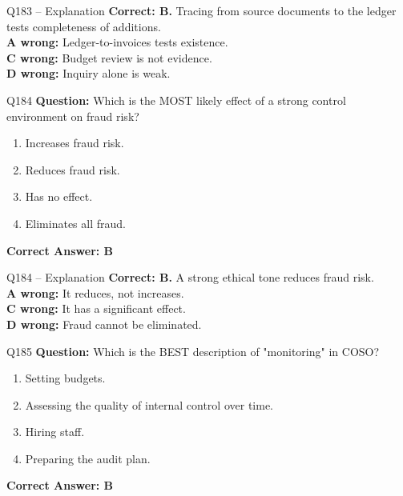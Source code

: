 \documentclass[aspectratio=169,10pt]{beamer}
\begin{document}
	\begin{frame}[t]{Q183 -- Explanation}
		\small
		\textbf{Correct: B.} Tracing from source documents to the ledger tests completeness of additions. \\[4pt]
		\textbf{A wrong:} Ledger-to-invoices tests existence. \\[2pt]
		\textbf{C wrong:} Budget review is not evidence. \\[2pt]
		\textbf{D wrong:} Inquiry alone is weak.
	\end{frame}
	
	\begin{frame}[t]{Q184}
		\small
		\textbf{Question:} Which is the MOST likely effect of a strong control environment on fraud risk?
		\begin{enumerate}[label=\Alph*.,itemsep=1pt,topsep=2pt]
			\item Increases fraud risk.
			\item Reduces fraud risk.
			\item Has no effect.
			\item Eliminates all fraud.
		\end{enumerate}
		\vspace{4pt}
		\textbf{Correct Answer: B}
	\end{frame}
	
	\begin{frame}[t]{Q184 -- Explanation}
		\small
		\textbf{Correct: B.} A strong ethical tone reduces fraud risk. \\[4pt]
		\textbf{A wrong:} It reduces, not increases. \\[2pt]
		\textbf{C wrong:} It has a significant effect. \\[2pt]
		\textbf{D wrong:} Fraud cannot be eliminated.
	\end{frame}
	
	\begin{frame}[t]{Q185}
		\small
		\textbf{Question:} Which is the BEST description of "monitoring" in COSO?
		\begin{enumerate}[label=\Alph*.,itemsep=1pt,topsep=2pt]
			\item Setting budgets.
			\item Assessing the quality of internal control over time.
			\item Hiring staff.
			\item Preparing the audit plan.
		\end{enumerate}
		\vspace{4pt}
		\textbf{Correct Answer: B}
	\end{frame}
	
\end{document}
